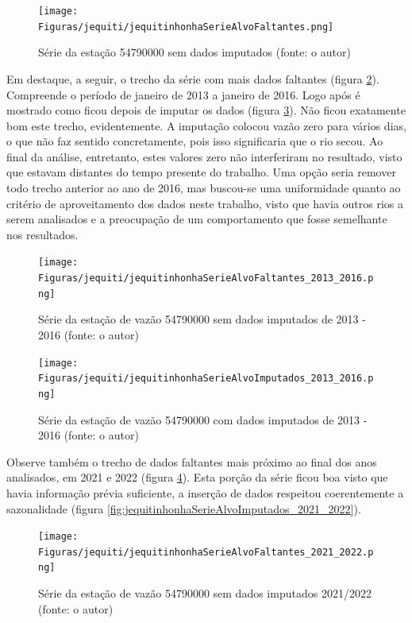 \begin{figure}[!h]
\centering
\texttt{[image: Figuras/jequiti/jequitinhonhaSerieAlvoFaltantes.png]}
\caption{Série da estação 54790000 sem dados imputados (fonte: o autor)}
\label{fig:jequitinhonhaSerieAlvoFaltantes}
\end{figure}

Em destaque, a seguir, o trecho da série com mais dados faltantes (figura \ref{fig:jequitinhonhaSerieAlvoFaltantes_2013_2016}). Compreende o período de janeiro de 2013 a janeiro de 2016. Logo após é mostrado como ficou depois de imputar os dados (figura \ref{fig:jequitinhonhaSerieAlvoImputados_2013_2016}). Não ficou exatamente bom este trecho, evidentemente. A imputação colocou vazão zero para vários dias, o que não faz sentido concretamente, pois isso significaria que o rio secou. Ao final da análise, entretanto, estes valores zero não interferiram no resultado, visto que estavam distantes do tempo presente do trabalho. Uma opção seria remover todo trecho anterior ao ano de 2016, mas buscou-se uma uniformidade quanto ao critério de aproveitamento dos dados neste trabalho, visto que havia outros rios a serem analisados e a preocupação de um comportamento que fosse semelhante nos resultados.

\begin{figure}[!h]
\centering
\texttt{[image: Figuras/jequiti/jequitinhonhaSerieAlvoFaltantes\_2013\_2016.png]}
\caption{Série da estação de vazão 54790000 sem dados imputados de 2013 - 2016 (fonte: o autor)}
\label{fig:jequitinhonhaSerieAlvoFaltantes_2013_2016}
\end{figure}


\begin{figure}[!h]
\centering
\texttt{[image: Figuras/jequiti/jequitinhonhaSerieAlvoImputados\_2013\_2016.png]}
\caption{Série da estação de vazão 54790000 com dados imputados de 2013 - 2016 (fonte: o autor)}
\label{fig:jequitinhonhaSerieAlvoImputados_2013_2016}
\end{figure}

Observe também o trecho de dados faltantes mais próximo ao final dos anos analisados, em 2021 e 2022 (figura \ref{fig:jequitinhonhaSerieAlvoFaltantes_2021_2022}). Esta porção da série ficou boa visto que havia informação prévia suficiente, a inserção de dados respeitou coerentemente a sazonalidade (figura \ref{fig:jequitinhonhaSerieAlvoImputados_2021_2022}).

\begin{figure}[!h]
\centering
\texttt{[image: Figuras/jequiti/jequitinhonhaSerieAlvoFaltantes\_2021\_2022.png]}
\caption{Série da estação de vazão 54790000 sem dados imputados 2021/2022 (fonte: o autor)}
\label{fig:jequitinhonhaSerieAlvoFaltantes_2021_2022}
\end{figure}

